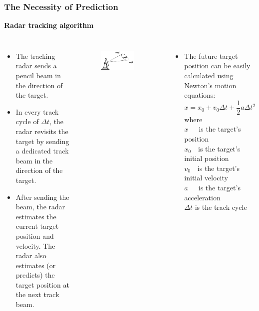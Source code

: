 \begin{frame}\frametitle{The Necessity of Prediction}
   
   \textbf{Radar tracking algorithm}
    
    \begin{columns}
        
    \begin{itemize}
        \item The tracking radar sends a pencil beam in the direction of the target.
        \item In every track cycle of $\Delta t$, the radar revisits the target by sending a dedicated track beam in the direction of the target.    
        \item After sending the beam, the radar estimates the current target position and velocity. The radar also estimates (or predicts) the target position at the next track beam.
    \end{itemize}
    \begin{figure}
		\centering
			\includegraphics[width=0.8\textwidth]{Figures/Background/tracking_radar.png}
		\label{fig:Radar_Tracking}
	\end{figure} 
        
    \vspace{-15pt}
    \begin{itemize}
        \item The future target position can be easily calculated using Newton's motion equations:
        \vspace{-8pt}
        $$x = x_0 + v_0 \Delta t + \frac{1}{2}a\Delta t^2$$
        where\\ 
        $x$~~~is the target's position\\
        $x_0$~~is the target's initial position\\
        $v_0$~~is the target's initial velocity\\
        $a$~~~is the target's acceleration\\
        $\Delta t$ is the track cycle\\
    \end{itemize}
    

\end{columns}
\end{frame}
